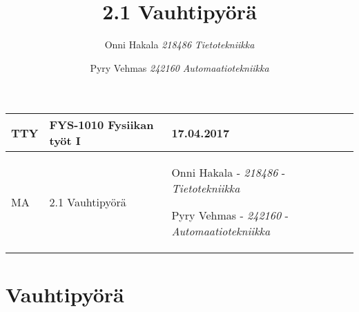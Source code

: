 \documentclass[]{article}
\title{2.1 Vauhtipyörä  }
\author{\Large Onni Hakala\vspace{0.05in} \newline\normalsize\emph{218486} \newline\normalsize\emph{Tietotekniikka}   \and \Large Pyry Vehmas\vspace{0.05in} \newline\normalsize\emph{242160} \newline\normalsize\emph{Automaatiotekniikka}  }
\date{}
\begin{document}
%
\pagestyle{empty}


\begin{center}
    \bgroup
    \renewcommand{\arraystretch}{2.0}
    \begin{tabular}{ | p{2.0cm} | p{5cm} | p{7cm} |}
    \hline
     TTY  &
     FYS-1010 Fysiikan työt I  &
     17.04.2017  \\ \hline
     MA  &
     2.1 Vauhtipyörä  &
    Onni Hakala - \emph{\small 218486} - \emph{\small Tietotekniikka}   \par Pyry Vehmas - \emph{\small 242160} - \emph{\small Automaatiotekniikka}    \\
    \hline
    \end{tabular}
    \egroup
\end{center}
\newpage

\pagestyle{plain}                       %
\setcounter{secnumdepth}{-1}            %

\linespread{1.2}                        %
\selectfont                             %

{
\hypersetup{linkcolor=black}
\setcounter{tocdepth}{2}
\tableofcontents
\newpage
}

\setcounter{secnumdepth}{2}            %
\linespread{1.3}                       %
\selectfont                            %



\vskip 6.5pt

\noindent  \section{Vauhtipyörä}\label{vauhtipyora}
\end{document}
